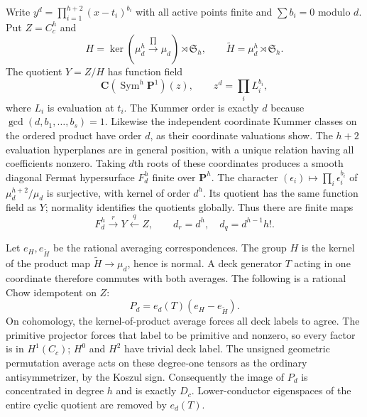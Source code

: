 \documentclass[11pt]{article}
\theoremstyle{definition}
\newcommand{\C}{\mathbf C}
\newcommand{\Sym}{\operatorname{Sym}}
\begin{document}
Write $y^d=\prod_{i=1}^{h+2}(x-t_i)^{b_i}$ with all active points
finite and $\sum b_i=0$ modulo $d$. Put $Z=C_c^h$ and
\[
 H=\ker(\mu_d^h\xrightarrow{\prod}\mu_d)\rtimes\mathfrak S_h,
 \qquad \widetilde H=\mu_d^h\rtimes\mathfrak S_h.
\]
The quotient $Y=Z/H$ has function field
\[
 \C(\Sym^h\mathbf P^1)(z),\qquad
 z^d=\prod_i L_i^{b_i},
\]
where $L_i$ is evaluation at $t_i$. The Kummer order is exactly $d$
because $\gcd(d,b_1,\ldots,b_s)=1$. Likewise the independent coordinate
Kummer classes on the ordered product have order $d$, as their
coordinate valuations show. The $h+2$ evaluation hyperplanes are in
general position, with a unique relation having all coefficients nonzero.
Taking $d$th roots of these coordinates produces a smooth diagonal
Fermat hypersurface $F_d^h$ finite over $\mathbf P^h$.
The character $(\epsilon_i)\mapsto\prod_i\epsilon_i^{b_i}$ of
$\mu_d^{h+2}/\mu_d$ is surjective, with kernel of order $d^h$.
Its quotient has the same function field as $Y$; normality identifies
the quotients globally. Thus there are finite maps
\[
 F_d^h\xrightarrow{r}Y\xleftarrow{q}Z,
 \qquad d_r=d^h,\quad d_q=d^{h-1}h!.
\]

Let $e_H,e_{\widetilde H}$ be the rational averaging correspondences.
The group $H$ is the kernel of the product map
$\widetilde H\to\mu_d$, hence is normal. A deck generator $T$
acting in one coordinate therefore commutes with both averages.
The following is a rational Chow idempotent on $Z$:
\begin{equation}\label{eq:ppdetprojector}
 P_d=e_d(T)(e_H-e_{\widetilde H}).
\end{equation}
On cohomology, the kernel-of-product average forces all deck labels
to agree. The primitive projector forces that label to be primitive
and nonzero, so every factor is in $H^1(C_c)$; $H^0$ and $H^2$
have trivial deck label. The unsigned geometric permutation average
acts on these degree-one tensors as the ordinary antisymmetrizer,
by the Koszul sign. Consequently the image of $P_d$ is concentrated
in degree $h$ and is exactly $D_c$. Lower-conductor eigenspaces of
the entire cyclic quotient are removed by $e_d(T)$.
\end{document}
